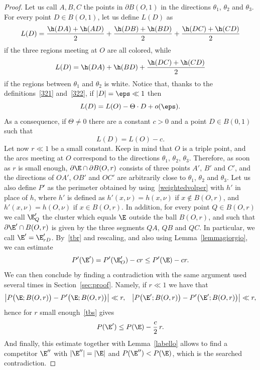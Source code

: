 \begin{proof}
Let us call $A,B,C$ the points in $\partial B(O,1)$ in the directions $\theta_1$, $\theta_2$ and $\theta_3$. For every point $D\in B(O,1)$, let us define $L(D)$ as
\[
L(D)= \frac{\h(DA) + \h(AD)}2 +\frac{\h(DB) + \h(BD)}2+\frac{\h(DC) + \h(CD)}2
\]
if the three regions meeting at $O$ are all colored, while
\[
L(D)=\h(DA) + \h(BD)+\frac{\h(DC) + \h(CD)}2
\]
if the regions between $\theta_1$ and $\theta_2$ is white. Notice that, thanks to the definitions~\eqref{321} and~\eqref{322}, if $|D|=\eps\ll 1$ then
\[
L(D) = L(O) - \Theta\cdot D + o(\eps).
\]
As a consequence, if $\Theta\neq 0$ there are a constant $c>0$ and a point $D\in B(0,1)$ such that
\begin{equation}\label{tbr}
L(D) = L(O) - c.
\end{equation}
Let now $r\ll 1$ be a small constant. Keep in mind that $O$ is a triple point, and the arcs meeting at $O$ correspond to the directions $\theta_1,\,\theta_2,\,\theta_3$. Therefore, as soon as $r$ is small enough, $\partial\E\cap \partial B(O,r)$ consists of three points $A',\,B'$ and $C'$, and the directions of $OA'$, $OB'$ and $OC'$ are arbitrarily close to $\theta_1$, $\theta_2$ and $\theta_3$. Let us also define $P'$ as the perimeter obtained by using~\eqref{weightedvolper} with $h'$ in place of $h$, where $h'$ is defined as $h'(x,\nu)=h(x,\nu)$ if $x\notin B(O,r)$, and $h'(x,\nu)=h(O,\nu)$ if $x\in B(O,r)$. In addition, for every point $Q\in B(O,r)$ we call $\E'_Q$ the cluster which equals $\E$ outside the ball $B(O,r)$, and such that $\partial\E'\cap B(O,r)$ is given by the three segments $QA$, $QB$ and $QC$. In particular, we call $\E'=\E'_{rD}$. By~\eqref{tbr} and rescaling, and also using Lemma~\ref{lemmagiorgio}, we can estimate
\begin{equation}\label{tbs}
P'(\E') = P'(\E'_O) - cr \leq P'(\E) - cr.
\end{equation}
We can then conclude by finding a contradiction with the same argument used several times in Section~\ref{sec:proof}. Namely, if $r\ll 1$ we have that
\begin{align*}
\big| P\big(\E;B(O,r)\big) - P'\big(\E;B(O,r)\big) \big| \ll r, &&
\big| P\big(\E';B(O,r)\big) - P'\big(\E';B(O,r)\big) \big| \ll r,
\end{align*}
hence for $r$ small enough~\eqref{tbs} gives
\[
P(\E') \leq P(\E) - \frac c2\, r.
\]
And finally, this estimate together with Lemma~\ref{labello} allows to find a competitor $\E''$ with $|\E''|=|\E|$ and $P(\E'')< P(\E)$, which is the searched contradiction.
\end{proof}

